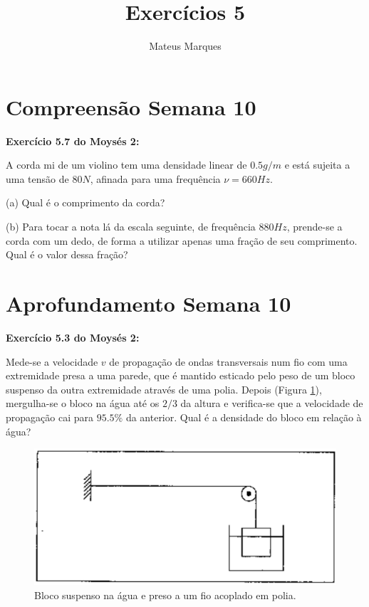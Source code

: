 \documentclass[a4paper,10pt]{article}
\title{\Huge{\textbf{Exercícios 5}}}
\author{Mateus Marques}
\begin{document}
\maketitle

\section{Compreensão Semana 10}

\textbf{Exercício 5.7 do Moysés 2:}

\n\n

A corda mi de um violino tem uma densidade linear de $0.5 \unit{g/m}$ e está sujeita a uma tensão de $80 \unit{N}$, afinada para uma frequência $\nu = 660 \unit{Hz}$.

\n

(a) Qual é o comprimento da corda?

\n

(b) Para tocar a nota lá da escala seguinte, de frequência $880 \unit{Hz}$, prende-se a corda com um dedo, de forma a utilizar apenas uma fração de seu comprimento. Qual é o valor dessa fração?

\section{Aprofundamento Semana 10}

\textbf{Exercício 5.3 do Moysés 2:}

\n\n

Mede-se a velocidade $v$ de propagação de ondas transversais num fio com uma extremidade presa a uma parede, que é mantido esticado pelo peso de um bloco suspenso da outra extremidade através de uma polia. Depois (Figura \ref{fig:FioPoliaBlocoAgua}), mergulha-se o bloco na água até os $2/3$ da altura e verifica-se que a velocidade de propagação cai para $95.5 \%$ da anterior. Qual é a densidade do bloco em relação à água?
\begin{figure}[H]
\centering
\includegraphics[width=0.6\linewidth]{fig/FioPoliaBlocoAgua.png}
\caption{Bloco suspenso na água e preso a um fio acoplado em polia.}
\label{fig:FioPoliaBlocoAgua}
\end{figure}
\end{document}
